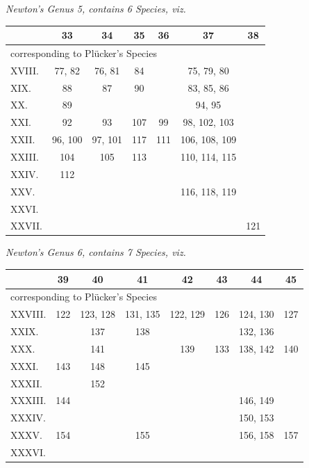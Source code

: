 \documentclass[11pt]{article}
\begin{document}
\medskip
\noindent\emph{Newton's Genus 5, contains 6 Species, viz.}
\begin{center}\small
\begin{tabular}{|l|c|c|c|c|c|c|}\hline
& 33 & 34 & 35 & 36 & 37 & 38 \\\hline
\multicolumn{7}{|l|}{\quad corresponding to Pl\"ucker's Species}\\\hline
XVIII.  & 77, 82  & 76, 81  & 84  &    & 75, 79, 80 &    \\\hline
XIX.    & 88      & 87      & 90  &    & 83, 85, 86 &    \\\hline
XX.     & 89      &         &     &    & 94, 95     &    \\\hline
XXI.    & 92      & 93      & 107 & 99 & 98, 102, 103 &    \\\hline
XXII.   & 96, 100 & 97, 101 & 117 & 111 & 106, 108, 109 &    \\\hline
XXIII.  & 104     & 105     & 113 &    & 110, 114, 115 &    \\\hline
XXIV.   & 112     &         &     &    &              &    \\\hline
XXV.    &         &         &     &    & 116, 118, 119 &    \\\hline
XXVI.   &         &         &     &    &              &    \\\hline
XXVII.  &         &         &     &    &              & 121 \\\hline
\end{tabular}
\end{center}

\medskip
\noindent\emph{Newton's Genus 6, contains 7 Species, viz.}
\begin{center}\small
\begin{tabular}{|l|c|c|c|c|c|c|c|}\hline
& 39 & 40 & 41 & 42 & 43 & 44 & 45 \\\hline
\multicolumn{8}{|l|}{\quad corresponding to Pl\"ucker's Species}\\\hline
XXVIII.  & 122     & 123, 128 & 131, 135 & 122, 129 & 126 & 124, 130 & 127 \\\hline
XXIX.    &         & 137      & 138      &          &     & 132, 136 &     \\\hline
XXX.     &         & 141      &          & 139      & 133 & 138, 142 & 140 \\\hline
XXXI.    & 143     & 148      & 145      &          &     &          &     \\\hline
XXXII.   &         & 152      &          &          &     &          &     \\\hline
XXXIII.  & 144     &          &          &          &     & 146, 149 &     \\\hline
XXXIV.   &         &          &          &          &     & 150, 153 &     \\\hline
XXXV.    & 154     &          & 155      &          &     & 156, 158 & 157 \\\hline
XXXVI.   &         &          &          &          &     &          &     \\\hline
\end{tabular}
\end{center}
\end{document}
